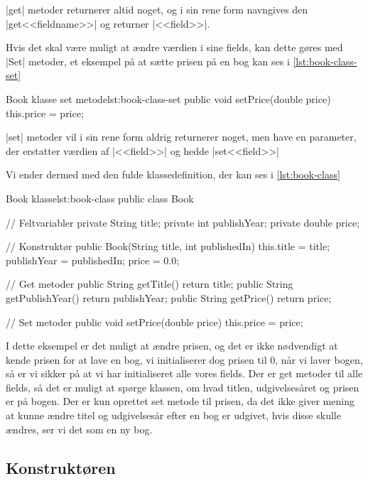 \JavaInline|get| metoder returnerer altid noget, og i sin rene form
navngives den \JavaInline|get<<fieldname>>| og returner
\JavaInline|<<field>>|.

Hvis det skal være muligt at ændre værdien i sine fields, kan dette
gøres med \JavaInline|Set| metoder, et eksempel på at sætte prisen på
en bog kan ses i \autoref{lst:book-class-set}

\begin{JavaCode}{Book klasse set metode}{lst:book-class-set}
	public void setPrice(double price) {
		this.price = price;
	}
\end{JavaCode}

\JavaInline|set| metoder vil i sin rene form aldrig returnerer noget,
men have en parameter, der erstatter værdien af \JavaInline|<<field>>|
og hedde \JavaInline|set<<field>>|

Vi ender dermed med den fulde klassedefinition, der kan ses i
\autoref{lst:book-class}

\begin{JavaCode}{Book klasse}{lst:book-class}
	public class Book {

		// Feltvariabler
		private String title;
		private int publishYear;
		private double price;

		// Konstruktør
		public Book(String title, int publishedIn) {
			this.title  = title;
			publishYear = publishedIn;
			price       = 0.0;
		}

		// Get metoder
		public String getTitle() {
			return title;
		}
		public String getPublishYear() {
			return publishYear;
		}
		public String getPrice() {
			return price;
		}

		// Set metoder
		public void setPrice(double price) {
			this.price = price;
		}
	}
\end{JavaCode}

I dette eksempel er det muligt at ændre prisen, og det er ikke
nødvendigt at kende prisen for at lave en bog, vi initialiserer dog
prisen til 0, når vi laver bogen, så er vi sikker på at vi har
initialiseret alle vores fields. Der er get metoder til alle fields,
så det er muligt at spørge klassen, om hvad titlen, udgivelsesåret og
prisen er på bogen. Der er kun oprettet set metode til prisen, da det
ikke giver mening at kunne ændre titel og udgivelsesår efter en bog er
udgivet, hvis disse skulle ændres, ser vi det som en ny bog.

\subsection{Konstruktøren}
\label{subsec:constructor}


